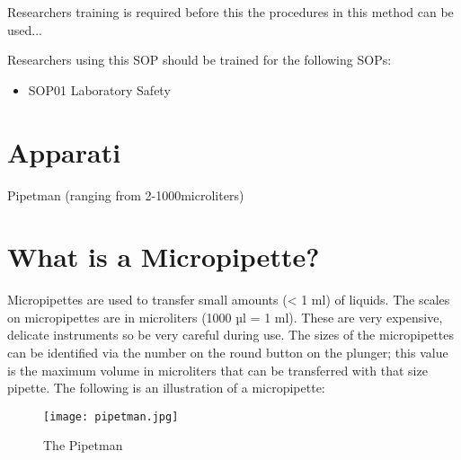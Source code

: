 \documentclass[12pt]{../SOP4_alpha}\usepackage[]{graphicx}\usepackage[]{xcolor}
\begin{document}
\NP Researchers training is required before this the procedures in this method can be used... 

\NP Researchers using this SOP should be trained for the following SOPs:

\begin{itemize}
  \item SOP01 Laboratory Safety
\end{itemize} 

\section{Apparati}

\NP Pipetman (ranging from 2-1000microliters)
\section {What is a Micropipette?}
Micropipettes are used to transfer small amounts (< 1 ml) of liquids. The scales on micropipettes are in microliters (1000 µl = 1 ml). These are very expensive, delicate instruments so be very careful during use. The sizes of the micropipettes can be identified via the number on the round button on the plunger; this value is the maximum volume in microliters that can be transferred with that size pipette. The following is an illustration of a micropipette:
\begin{figure} [h!]
\caption{The Pipetman}
\texttt{[image: pipetman.jpg]}
\end{figure}
\end{document}
